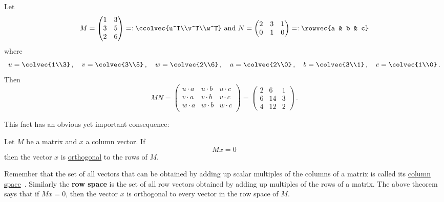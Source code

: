 \begin{example}
Let \[M=\begin{pmatrix}1&3\\3&5\\2&6\end{pmatrix}=:\ccolvec{u^T\\v^T\\w^T}
\mbox{ and }
N=\begin{pmatrix}2&3&1\\0&1&0\end{pmatrix}=:\rowvec{a & b & c}\]
where
\[
u=\colvec{1\\3}\, ,\quad
v=\colvec{3\\5}\, ,\quad 
w=\colvec{2\\6}\, ,\quad
a=\colvec{2\\0}\, ,\quad
b=\colvec{3\\1}\, ,\quad 
c=\colvec{1\\0}\, .
\]
Then 
\[
MN=\left(\!\begin{array}{ccc}
u\cdot a & u\cdot b & u\cdot c\\
v\cdot a & v\cdot b & v\cdot c\\
w\cdot a & w\cdot b & w\cdot c\\ 
\end{array}\!\right)
=
\begin{pmatrix}
2&6&1\\
6&14&3\\
4&12&2
\end{pmatrix}\, .
\]
\end{example}
This fact has an obvious yet important consequence:

\begin{theorem}
Let $M$ be a matrix and $x$ a column vector. If 
\[
Mx=0
\]
then the vector $x$ is \hyperlink{orthog}{orthogonal} to the rows of $M$.
\end{theorem}

\begin{remark}
Remember that the set of all vectors that can be obtained by adding up scalar multiples of the columns of a matrix is called its \hyperlink{column space}{column space}~. Similarly the {\bfseries row space} is the set of all row vectors obtained by adding up multiples of the rows of a matrix. The above theorem says that if $Mx=0$, then the vector $x$ is orthogonal to every vector in the row space of $M$.
\end{remark}



